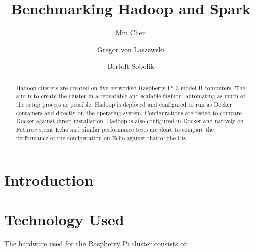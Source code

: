 \title{Benchmarking Hadoop and Spark}


\author{Min Chen}

\author{Gregor von Laszewski}

\author{Bertolt Sobolik}


\renewcommand{\shortauthors}{M. Chen, G. v. Laszewski, B. Sobolik}


\begin{abstract}
Hadoop clusters are created on five networked Raspberry Pi 3 model B
computers. The aim is to create the cluster in a repeatable and
scalable fashion, automating as much of the setup process as
possible. Hadoop is deployed and configured to run as Docker
containers and directly on the operating system. Configurations are
tested to compare Docker against direct installation. Hadoop is also
configured in Docker and natively on Futuresystems Echo and similar
performance tests are done to compare the performance of the
configuration on Echo against that of the Pis.
\end{abstract}



\maketitle

\section{Introduction}


\section{Technology Used}
The hardware used for the Raspberry Pi cluster consists of:

